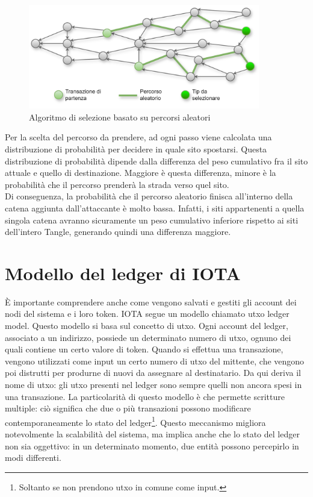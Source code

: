 \documentclass[12pt,a4paper,openright,twoside]{report}
\begin{document}
\begin{figure}[h]
\begin{center}
\includegraphics[width=0.9\textwidth]{figures/my_random_walk.png}
\caption[Percorsi aleatori]{Algoritmo di selezione basato su percorsi aleatori}\label{fig:random_walk}
\end{center}
\end{figure}
Per la scelta del percorso da prendere, ad ogni passo viene calcolata una distribuzione di probabilità per decidere in quale sito spostarsi. Questa distribuzione di probabilità dipende dalla differenza del peso cumulativo fra il sito attuale e quello di destinazione. Maggiore è questa differenza, minore è la probabilità che il percorso prenderà la strada verso quel sito.\\
Di conseguenza, la probabilità che il percorso aleatorio finisca all'interno della catena aggiunta dall'attaccante è molto bassa. Infatti, i siti appartenenti a quella singola catena avranno sicuramente un peso cumulativo inferiore rispetto ai siti dell'intero Tangle, generando quindi una differenza maggiore.

\section{Modello del ledger di IOTA}
\label{iotamodel}
È importante comprendere anche come vengono salvati e gestiti gli account dei nodi del sistema e i loro token. IOTA segue un modello chiamato \acrshort{utxo} ledger model. Questo modello si basa sul concetto di \acrfull{utxo}. Ogni account del ledger, associato a un indirizzo, possiede un determinato numero di \acrshort{utxo}, ognuno dei quali contiene un certo valore di token. Quando si effettua una transazione, vengono utilizzati come input un certo numero di \acrshort{utxo} del mittente, che vengono poi distrutti per produrne di nuovi da assegnare al destinatario. Da qui deriva il nome di \acrlong{utxo}: gli \acrshort{utxo} presenti nel ledger sono sempre quelli non ancora spesi in una transazione. La particolarità di questo modello è che permette scritture multiple: ciò significa che due o più transazioni possono modificare contemporaneamente lo stato del ledger\footnote{Soltanto se non prendono \acrshort{utxo} in comune come input.}. Questo meccanismo migliora notevolmente la scalabilità del sistema, ma implica anche che lo stato del ledger non sia oggettivo: in un determinato momento, due entità possono percepirlo in modi differenti.
\end{document}
